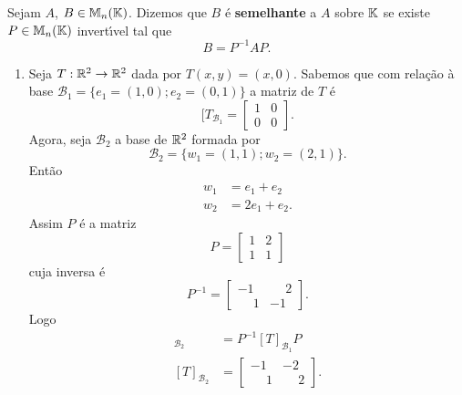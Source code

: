 \begin{definicao}
	Sejam $A$, $B \in \mathbb{M}_n(\mathbb{K})$. Dizemos que $B$ \'e \textbf{semelhante} a $A$ sobre $\mathbb{K}$ se existe $P \in \mathbb{M}_n(\mathbb{K})$ invert{\'\i}vel tal que
	\[
		B = P^{-1}AP.
	\]
\end{definicao}

\begin{exemplos}
	\begin{enumerate}[label={\arabic*})]
		\item Seja $T : \mathbb{R}^2 \to \mathbb{R}^2$ dada por $T(x,y) = (x,0)$. Sabemos que com rela\c{c}\~ao \`a base $\mathcal{B}_1 = \{e_1=(1,0);e_2=(0,1)\}$ a matriz de $T$ \'e
		\[
			[T_{\mathcal{B}_1} = \begin{bmatrix}
				1 & 0\\
				0 & 0
			\end{bmatrix}.
		\]
		Agora, seja $\mathcal{B}_2$ a base de $\mathbb{R}^2$ formada por
		\[
			\mathcal{B}_2 = \{w_1 = (1,1);w_2=(2,1)\}.
		\]
		Ent\~ao
		\begin{align*}
			w_1 &= e_1 + e_2\\
			w_2 &= 2e_1 + e_2.
		\end{align*}
		Assim $P$ \'e a matriz
		\[
			P = \begin{bmatrix}
				1 & 2\\
				1 & 1
			\end{bmatrix}
		\]
		cuja inversa \'e
		\[
			P^{-1} = \begin{bmatrix}
				-1 & \phantom{-}2\\
				\phantom{-}1 & -1
			\end{bmatrix}.
		\]
		Logo
		\begin{align*}
			[T]_{\mathcal{B}_2} &= P^{-1}[T]_{\mathcal{B}_1}P\\
			[T]_{\mathcal{B}_2} &= \begin{bmatrix}
				-1 & -2\\
				\phantom{-}1 & \phantom{-}2
			\end{bmatrix}.
		\end{align*}


\end{enumerate}
\end{exemplos}
